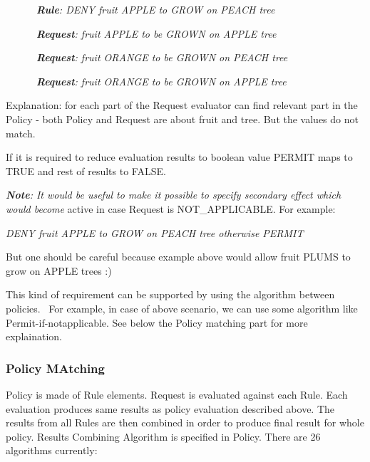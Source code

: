 \documentclass{article}
\begin{document}
{\upshape\color{black}
\textit{\ \ \ \ \ \ }\textbf{\textit{Rule}}\textit{: DENY fruit APPLE to
GROW on PEACH tree}}

{\upshape\color{black}
\textit{\ \ \ \ \ \ }\textbf{\textit{Request}}\textit{: fruit APPLE to
be GROWN on APPLE tree }}

{\upshape\color{black}
\textit{\ \ \ \ \ \ }\textbf{\textit{Request}}\textit{: fruit ORANGE to
be GROWN on PEACH tree }}

{\upshape\color{black}
\textit{\ \ \ \ \ \ }\textbf{\textit{Request}}\textit{: fruit ORANGE to
be GROWN on APPLE tree }}

{\color{black}
Explanation: for each part of the Request evaluator can find relevant
part in the Policy - both Policy and Request are about fruit and tree.
But the values do not match.}

{\color{black}
If it is required to reduce evaluation results to boolean value PERMIT
maps to TRUE and rest of results to FALSE.}

{\upshape\color{black}
\textbf{\textit{Note}}\textit{: It would be useful to make it possible
to specify secondary effect which would become }active in case Request
is NOT\_APPLICABLE. For example:}

{\itshape\color{black}
DENY fruit APPLE to GROW on PEACH tree otherwise PERMIT}

{\color{black}
But one should be careful because example above would allow fruit PLUMS
to grow on APPLE trees :)}

{\color{black}
This kind of requirement can be supported by using the algorithm between
policies. \ For example, in case of above scenario, we can use some
algorithm like {\textquotedbl}Permit-if-notapplicable{\textquotedbl}.
See below the {\textquotedbl}Policy matching{\textquotedbl} part for
more explaination. \ }

\subsubsection{Policy MAtching}
{\upshape\color{black}
Policy is made of Rule elements. Request is evaluated against each Rule.
Each evaluation produces same results as policy evaluation described
above. The results from all Rules are then combined in order to produce
final result for whole policy. Results Combining Algorithm is specified
in Policy. There are 26 algorithms currently:}
\end{document}
